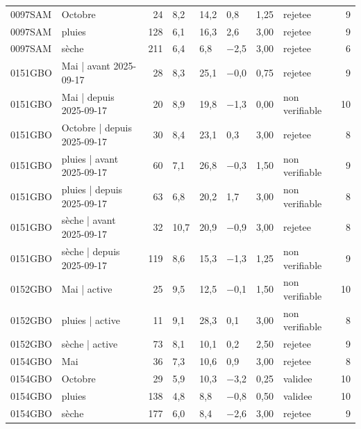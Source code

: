 \begin{table}[htbp]
\begin{tabular}{llrlllllr}
0097SAM & Octobre & 24 & 8,2 & 14,2 & 0,8 & 1,25 & rejetee & 9 \\
0097SAM & pluies & 128 & 6,1 & 16,3 & 2,6 & 3,00 & rejetee & 9 \\
0097SAM & sèche & 211 & 6,4 & 6,8 & −2,5 & 3,00 & rejetee & 6 \\
0151GBO & Mai | avant 2025-09-17 & 28 & 8,3 & 25,1 & −0,0 & 0,75 & rejetee & 9 \\
0151GBO & Mai | depuis 2025-09-17 & 20 & 8,9 & 19,8 & −1,3 & 0,00 & non verifiable & 10 \\
0151GBO & Octobre | depuis 2025-09-17 & 30 & 8,4 & 23,1 & 0,3 & 3,00 & rejetee & 8 \\
0151GBO & pluies | avant 2025-09-17 & 60 & 7,1 & 26,8 & −0,3 & 1,50 & non verifiable & 9 \\
0151GBO & pluies | depuis 2025-09-17 & 63 & 6,8 & 20,2 & 1,7 & 3,00 & non verifiable & 8 \\
0151GBO & sèche | avant 2025-09-17 & 32 & 10,7 & 20,9 & −0,9 & 3,00 & rejetee & 8 \\
0151GBO & sèche | depuis 2025-09-17 & 119 & 8,6 & 15,3 & −1,3 & 1,25 & non verifiable & 9 \\
0152GBO & Mai | active & 25 & 9,5 & 12,5 & −0,1 & 1,50 & non verifiable & 10 \\
0152GBO & pluies | active & 11 & 9,1 & 28,3 & 0,1 & 3,00 & non verifiable & 8 \\
0152GBO & sèche | active & 73 & 8,1 & 10,1 & 0,2 & 2,50 & rejetee & 9 \\
0154GBO & Mai & 36 & 7,3 & 10,6 & 0,9 & 3,00 & rejetee & 8 \\
0154GBO & Octobre & 29 & 5,9 & 10,3 & −3,2 & 0,25 & validee & 10 \\
0154GBO & pluies & 138 & 4,8 & 8,8 & −0,8 & 0,50 & validee & 10 \\
0154GBO & sèche & 177 & 6,0 & 8,4 & −2,6 & 3,00 & rejetee & 9 \\
\bottomrule
\end{tabular}
\end{table}
